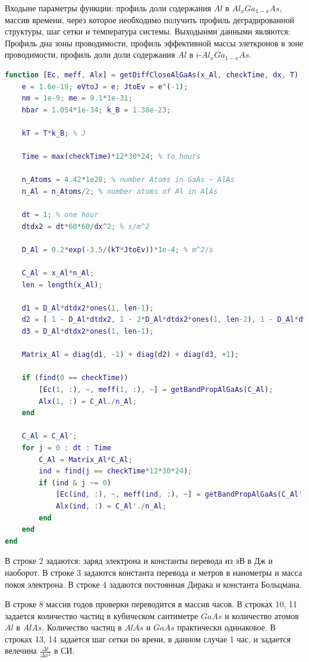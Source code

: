 Входыне параметры функции: профиль доли содержания $Al$ в $Al_{x}Ga_{1-x}As$, массив времени, через которое необходимо получить профиль деградированной структуры, шаг сетки и температура системы. Выходынми данными являются: Профиль дна зоны проводимости, профиль эффективной массы элеткронов в зоне проводимости, профиль доли доли содержания $Al$ в $i$-$Al_{x}Ga_{1-x}As$.
\begin{lstlisting}[style=realcode,language=Matlab,caption={Функция рассчета диффузионного расплытия $Al$ в <<закрытой>> гетероструктуре на основе $i$-$Al_{x}Ga_{1-x}As$},label={lst:CD}]
function [Ec, meff, Alx] = getDiffCloseAlGaAs(x_Al, checkTime, dx, T)
	e = 1.6e-19; eVtoJ = e; JtoEv = e^(-1);
	nm = 1e-9; me = 9.1*1e-31;
	hbar = 1.054*1e-34; k_B = 1.38e-23;

	kT = T*k_B; % J

	Time = max(checkTime)*12*30*24; % to hours

	n_Atoms = 4.42*1e28; % number Atoms in GaAs ~ AlAs
	n_Al = n_Atoms/2; % number atoms of Al in AlAs

	dt = 1; % one hour
	dtdx2 = dt*60*60/dx^2; % s/m^2

	D_Al = 0.2*exp(-3.5/(kT*JtoEv))*1e-4; % m^2/s

	C_Al = x_Al*n_Al;
	len = length(x_Al);

	d1 = D_Al*dtdx2*ones(1, len-1);
	d2 = [ 1 - D_Al*dtdx2, 1 - 2*D_Al*dtdx2*ones(1, len-2), 1 - D_Al*dtdx2 ];
	d3 = D_Al*dtdx2*ones(1, len-1);
	
	Matrix_Al = diag(d1, -1) + diag(d2) + diag(d3, +1);

	if (find(0 == checkTime))
		[Ec(1, :), ~, meff(1, :), ~] = getBandPropAlGaAs(C_Al);
		Alx(1, :) = C_Al./n_Al;		
	end

	C_Al = C_Al';
	for j = 0 : dt : Time
		C_Al = Matrix_Al*C_Al;
		ind = find(j == checkTime*12*30*24); 
		if (ind & j ~= 0)
			[Ec(ind, :), ~, meff(ind, :), ~] = getBandPropAlGaAs(C_Al');
			Alx(ind, :) = C_Al'./n_Al;
		end
	end
end
\end{lstlisting}

В строке 2 задаются: заряд электрона и константы перевода из эВ в Дж и наоборот. В строке 3 задаются константа перевода и метров в нанометры и масса покоя электрона. В строке 4 задаются постоянная Дирака и константа Больцмана.

В строке 8 массив годов проверки переводится в массив часов. В строках 10, 11 задается количество частиц в кубическом сантиметре $GaAs$ и количество атомов $Al$ в $AlAs$. Количество частиц в $AlAs$ и $GaAs$ практически одинаковое. В строках 13, 14 задается шаг сетки по врени, в данном случае 1 час, и задается велечина $\frac{\Delta t}{\Delta x^{2}}$ в СИ.

